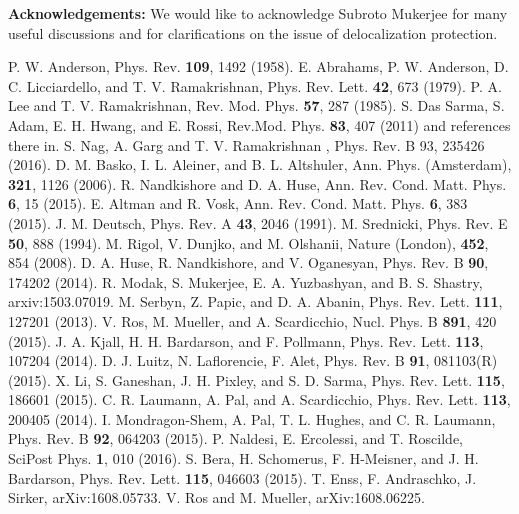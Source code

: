 \documentclass[prl,aps,twocolumn,floats,nofootinbib,showpacs]{revtex4}
\begin{document}
{\bf Acknowledgements:}
We would like to acknowledge Subroto Mukerjee for many useful discussions and for clarifications on the issue of delocalization protection. 
\begin{thebibliography}{99}
\vspace{1cm}
P. W. Anderson, Phys. Rev. {\bf 109}, 1492 (1958).
E. Abrahams, P. W. Anderson, D. C. Licciardello, and T. V. Ramakrishnan, Phys. Rev. Lett. {\bf 42}, 673 (1979).
P. A. Lee and T. V. Ramakrishnan, Rev. Mod. Phys. {\bf 57}, 287 (1985).
S. Das Sarma, S. Adam, E. H. Hwang, and E. Rossi, Rev.Mod. Phys. {\bf 83}, 407 (2011) and references there in.
S. Nag, A. Garg and T. V. Ramakrishnan , Phys. Rev. B 93, 235426 (2016).
D. M. Basko, I. L. Aleiner, and B. L. Altshuler, Ann. Phys. (Amsterdam), {\bf 321}, 1126 (2006). 
R. Nandkishore and D. A. Huse, Ann. Rev. Cond. Matt. Phys. {\bf 6}, 15 (2015). 
E. Altman and R. Vosk, Ann. Rev. Cond. Matt. Phys. {\bf 6}, 383 (2015).
J. M. Deutsch, Phys. Rev. A {\bf 43}, 2046 (1991).
M. Srednicki, Phys. Rev. E {\bf 50}, 888 (1994).
M. Rigol, V. Dunjko, and M. Olshanii, Nature (London), {\bf 452}, 854 (2008).
D. A. Huse, R. Nandkishore, and V. Oganesyan, Phys. Rev. B {\bf 90}, 174202 (2014).
R. Modak, S. Mukerjee, E. A. Yuzbashyan, and B. S. Shastry, arxiv:1503.07019. 
M. Serbyn, Z. Papic, and D. A. Abanin, Phys. Rev. Lett. {\bf 111}, 127201 (2013).
V. Ros, M. Mueller, and A. Scardicchio, Nucl. Phys. B {\bf 891}, 420 (2015).
J. A. Kjall, H. H. Bardarson, and F. Pollmann, Phys. Rev. Lett. {\bf 113}, 107204 (2014).
D. J. Luitz, N. Laflorencie, F. Alet, Phys. Rev. B {\bf 91}, 081103(R) (2015). 
X. Li, S. Ganeshan, J. H. Pixley, and S. D. Sarma, Phys. Rev. Lett. {\bf 115}, 186601 (2015).
C. R. Laumann, A. Pal, and A. Scardicchio, Phys. Rev. Lett. {\bf 113}, 200405 (2014).
I. Mondragon-Shem, A. Pal, T. L. Hughes, and C. R. Laumann, Phys. Rev. B {\bf 92}, 064203 (2015).
P. Naldesi, E. Ercolessi, and T. Roscilde, SciPost Phys. {\bf 1}, 010 (2016). 
S. Bera, H. Schomerus, F. H-Meisner, and J. H. Bardarson, Phys. Rev. Lett. {\bf 115}, 046603 (2015). 
T. Enss, F. Andraschko, J. Sirker, arXiv:1608.05733.
V. Ros and M. Mueller, arXiv:1608.06225. 

\end{thebibliography}
\end{document}
